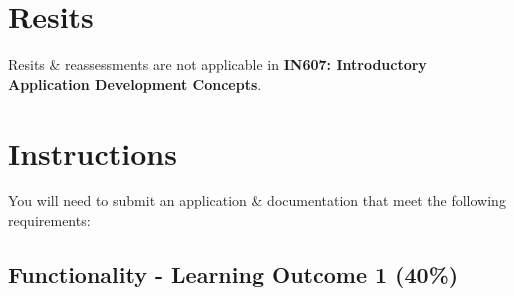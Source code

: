 \documentclass{article}
\begin{document}
\section*{Resits}
Resits \& reassessments are not applicable in \textbf{IN607: Introductory Application Development Concepts}. 

\newpage

\section*{Instructions}
You will need to submit an application \& documentation that meet the following requirements:

\subsection*{Functionality - Learning Outcome 1 (40\%)}
\end{document}
